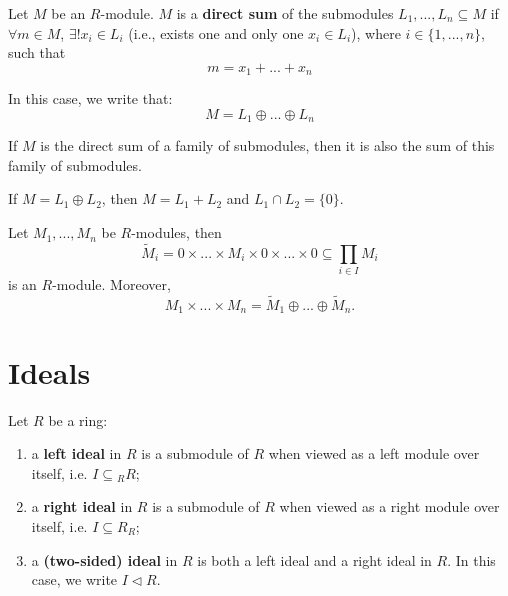 \documentclass[12pt, a4paper, titlepage]{report}
\begin{document}
\begin{defn}
  Let $M$ be an $R$-module. $M$ is a \textbf{direct sum} of the submodules $L_1, ..., L_n \subseteq M$
  if $\forall m \in M$, $\exists! x_i \in L_i$ (i.e., exists one and only one $x_i \in L_i$),
  where $i \in \{ 1, ..., n \}$, such that
  \[
    m = x_1 + ... + x_n
  \]

  In this case, we write that:
  \[
    M = L_1 \oplus ... \oplus L_n
  \]
\end{defn}

\begin{rem}
  If $M$ is the direct sum of a family of submodules, then it is also the sum of this family of submodules.
\end{rem}

\begin{rem}
  If $M = L_1 \oplus L_2$, then $M = L_1 + L_2$ and $L_1 \cap L_2 = \{0\}$.
\end{rem}

\begin{rem}
  Let $M_1, ..., M_n$ be $R$-modules, then
  \[
    \widetilde{M}_i = 0 \times ... \times M_i \times 0 \times ... \times 0 \subseteq \prod_{i \in I} M_i
  \]
  is an $R$-module. Moreover,
  \[
    M_1 \times ... \times M_n = \widetilde{M}_1 \oplus ... \oplus \widetilde{M}_n.
  \]

\end{rem}

\section{Ideals}

\begin{defn}
  Let $R$ be a ring:

  \begin{enumerate}
  \item a \textbf{left ideal} in $R$ is a submodule of $R$ when viewed as a left module over itself, i.e.
    $I \subseteq {}_RR$;
  \item a \textbf{right ideal} in $R$ is a submodule of $R$ when viewed as a right module over itself, i.e.
    $I \subseteq R_R$;
  \item a \textbf{(two-sided) ideal} in $R$ is both a left ideal and a right ideal in $R$. In this case, we
    write $I \lhd R$.
  \end{enumerate}
\end{defn}
\end{document}
